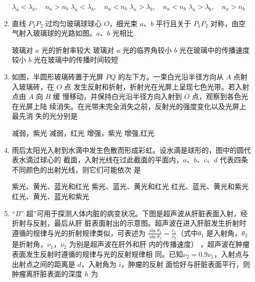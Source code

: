 \begin{enumerate}
\fourchoices
{$\lambda_{a}<\lambda_{b}, \quad n_{a}>n_{b}$}
{$\lambda_{a}<\lambda_{b}, \quad n_{a}<n_{b}$}
{$\lambda_{a}>\lambda_{b}, \quad n_{a}<n_{b}$}
{$\lambda_{a}>\lambda_{b}, \quad n_{a}>n_{b}$}


\item 
{}
 直线 $ P_{1} P_{2} $ 过均匀玻璃球球心 $ O $，细光束 $ a $、$ b $ 平行且关于 $ P_{1} P_{2} $ 对称，由空
气射入玻璃球的光路如图。$ a $、$ b $ 光相比  
\begin{figure}[h!]
	\centering
	
\end{figure}


\fourchoices
{玻璃对 $ a $ 光的折射率较大}
{玻璃对 $ a $ 光的临界角较小}
{$ b $ 光在玻璃中的传播速度较小}
{$ b $ 光在玻璃中的传播时间较短}



\item 
{}
如图，半圆形玻璃砖置于光屏 $ PQ $ 的左下方。一束白光沿半径方向从 $ A $ 点射入玻璃砖，在 $ O $ 点
发生反射和折射，折射光在光屏上呈现七色光带。若入射点由 $ A $ 向 $ B $ 缓
慢移动，并保持白光沿半径方向入射到 $ O $ 点，观察到各色光在光屏上陆
续消失。在光带未完全消失之前，反射光的强度变化以及光屏上最先消
失的光分别是  
\begin{figure}[h!]
	\centering
	
\end{figure}

\fourchoices
{减弱，紫光}
{减弱，红光}
{增强，紫光}
{增强,红光}



\item 
{}
雨后太阳光入射到水滴中发生色散而形成彩虹。设水滴是球形的，图中的圆代表水滴过球心的
截面，入射光线在过此截面的平面内，$ a $、$ b $、$ c $、$ d $ 代表四条不同颜色的出射光线，则它们可能依次
是  
\begin{figure}[h!]
	\centering
	
\end{figure}

\fourchoices
{紫光、黄光、蓝光和红光}
{紫光、蓝光、黄光和红光}
{红光、蓝光、黄光和紫光}
{红光、黄光、蓝光和紫光}


\item 
{}
“$ B $” 超”可用于探测人体内脏的病变状况。下图是超声波从肝脏表面入射，经折射与反射，最后从肝
脏表面射出的示意图。超声波在进入肝脏发生折射时遵循的规律与光的折射规律类似，可表述为
$\frac{\sin \theta_{1}}{\sin \theta_{2}}=\frac{v_{1}}{v_{2}}$（式中$ \theta_{1} $ 是入射角，$ \theta _{2} $ 是折射角，$ \nu_{1} $，$ \nu_{2} $ 为别是超声波在肝外和肝
内的传播速度）
，超声波在肿瘤表面发生反射时遵循的规律与光的反射规律相
同。已知$ \nu _{2} =0.9 \nu_{1} $，入射点与出射点之间的距离是 $ d $，入射角为 $ i $，肿瘤的反射
面恰好与肝脏表面平行，则肿瘤离肝脏表面的深度 $ h $ 为  
\begin{figure}[h!]
	\centering
	
\end{figure}



\end{enumerate}

